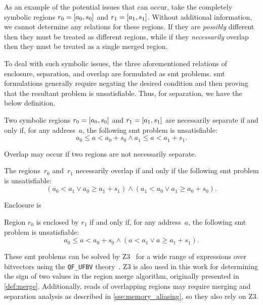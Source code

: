 As an example of the potential issues that can occur,
take the completely symbolic regions $r_0=[a_0,s_0]$
and $r_1=[a_1,s_1]$.
Without additional information, we cannot determine any relations for these regions.
If they are \emph{possibly} different then they must be treated as different regions,
while if they \emph{necessarily} overlap
then they must be treated as a single merged region.

To deal with such symbolic issues,
the three aforementioned relations of enclosure, separation, and overlap
are formulated as \ac{smt} problems.
\Ac{smt} formulations generally require negating the desired condition
and then proving that the resultant problem is unsatisfiable.
Thus, for separation, we have the below definition.
\begin{definition}
  Two symbolic regions $r_0=[a_0,s_0]$ and $r_1=[a_1,s_1]$
  are necessarily separate if and only if, for any address~$a$,
  the following \ac{smt} problem is unsatisfiable:
  \begin{equation*}
  a_0\leq a<a_0+s_0\wedge a_1\leq a<a_1+s_1.
  \end{equation*}
\end{definition}
Overlap may occur if two regions are not necessarily separate.
\begin{definition}
  The regions~$r_0$ and~$r_1$ necessarily overlap if and only if
  the following \ac{smt} problem is unsatisfiable:
  \begin{equation*}
  (a_0<a_1\vee a_0\geq a_1+s_1)\wedge(a_1<a_0\vee a_1\geq a_0+s_0).
  \end{equation*}
\end{definition}
Enclosure is 
\begin{definition}
  Region $r_0$ is enclosed by $r_1$ if and only if,
  for any address~$a$, the following \ac{smt} problem is unsatisfiable:
  \begin{equation*}
  a_0\leq a<a_0+s_0\wedge(a<a_1\vee a \geq a_1 + s_1).
  \end{equation*}
\end{definition}
These \ac{smt} problems can be solved by Z3~\citep{de2008z3}
for a wide range of expressions over bitvectors
using the \texttt{QF\_UFBV} theory~\citep{barrett2017smt}.
Z3 is also used in this work for determining the sign of two values
in the region merge algorithm, originally presented in \cref{def:merge}.
Additionally, reads of overlapping regions may require merging
and separation analysis as described in \cref{sse:memory_aliasing},
so they also rely on Z3.

